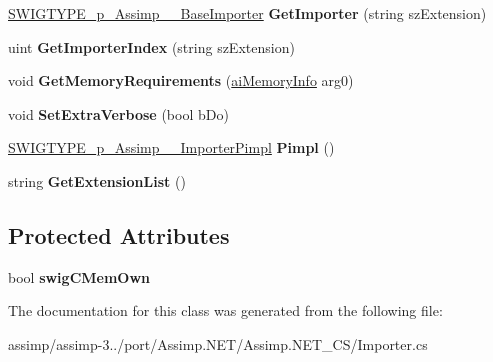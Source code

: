 \begin{DoxyCompactItemize}
\item 
\hypertarget{class_importer_a3c640e5781b01befd37656a125b4b4b6}{\hyperlink{class_s_w_i_g_t_y_p_e__p___assimp_____base_importer}{S\+W\+I\+G\+T\+Y\+P\+E\+\_\+p\+\_\+\+Assimp\+\_\+\+\_\+\+Base\+Importer} {\bfseries Get\+Importer} (string sz\+Extension)}\label{class_importer_a3c640e5781b01befd37656a125b4b4b6}

\item 
\hypertarget{class_importer_a229715d4225765e58248d457069de504}{uint {\bfseries Get\+Importer\+Index} (string sz\+Extension)}\label{class_importer_a229715d4225765e58248d457069de504}

\item 
\hypertarget{class_importer_a7376a72ac03ae2ef97e1aa57ab899145}{void {\bfseries Get\+Memory\+Requirements} (\hyperlink{classai_memory_info}{ai\+Memory\+Info} arg0)}\label{class_importer_a7376a72ac03ae2ef97e1aa57ab899145}

\item 
\hypertarget{class_importer_a3ebf2d1965f3a011a31f7a4948d07f22}{void {\bfseries Set\+Extra\+Verbose} (bool b\+Do)}\label{class_importer_a3ebf2d1965f3a011a31f7a4948d07f22}

\item 
\hypertarget{class_importer_aef6b91b51264dc9c1e0e45f809bb022f}{\hyperlink{class_s_w_i_g_t_y_p_e__p___assimp_____importer_pimpl}{S\+W\+I\+G\+T\+Y\+P\+E\+\_\+p\+\_\+\+Assimp\+\_\+\+\_\+\+Importer\+Pimpl} {\bfseries Pimpl} ()}\label{class_importer_aef6b91b51264dc9c1e0e45f809bb022f}

\item 
\hypertarget{class_importer_a1334fdd980289a3ad7623ff8fd63c6f7}{string {\bfseries Get\+Extension\+List} ()}\label{class_importer_a1334fdd980289a3ad7623ff8fd63c6f7}

\end{DoxyCompactItemize}
\subsection*{Protected Attributes}
\begin{DoxyCompactItemize}
\item 
\hypertarget{class_importer_ac586adaa6ed12270e101a9b88a2950fd}{bool {\bfseries swig\+C\+Mem\+Own}}\label{class_importer_ac586adaa6ed12270e101a9b88a2950fd}

\end{DoxyCompactItemize}


The documentation for this class was generated from the following file\+:\begin{DoxyCompactItemize}
\item 
assimp/assimp-\/3../port/\+Assimp.\+N\+E\+T/\+Assimp.\+N\+E\+T\+\_\+\+C\+S/Importer.\+cs\end{DoxyCompactItemize}

